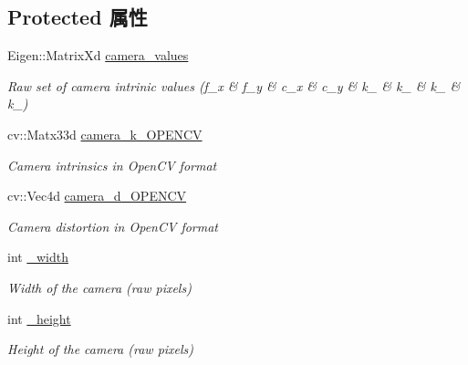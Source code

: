 \subsection*{Protected 属性}
\begin{DoxyCompactItemize}
\item 
\mbox{\label{classov__core_1_1CamBase_a3b9b353487071aef189fc5bc313dab5d}} 
Eigen\+::\+Matrix\+Xd \hyperlink{classov__core_1_1CamBase_a3b9b353487071aef189fc5bc313dab5d}{camera\+\_\+values}
\begin{DoxyCompactList}\small\item\em Raw set of camera intrinic values (f\+\_\+x \& f\+\_\+y \& c\+\_\+x \& c\+\_\+y \& k\+\_ \& k\+\_ \& k\+\_ \& k\+\_) \end{DoxyCompactList}\item 
\mbox{\label{classov__core_1_1CamBase_a867f7b5a903cc2776227c9b16fdde162}} 
cv\+::\+Matx33d \hyperlink{classov__core_1_1CamBase_a867f7b5a903cc2776227c9b16fdde162}{camera\+\_\+k\+\_\+\+O\+P\+E\+N\+CV}
\begin{DoxyCompactList}\small\item\em Camera intrinsics in Open\+CV format \end{DoxyCompactList}\item 
\mbox{\label{classov__core_1_1CamBase_a5783a122e28281c1cd72a23f4bee212c}} 
cv\+::\+Vec4d \hyperlink{classov__core_1_1CamBase_a5783a122e28281c1cd72a23f4bee212c}{camera\+\_\+d\+\_\+\+O\+P\+E\+N\+CV}
\begin{DoxyCompactList}\small\item\em Camera distortion in Open\+CV format \end{DoxyCompactList}\item 
\mbox{\label{classov__core_1_1CamBase_aa7b9e38e6da0ee85af5f82c3bc3ea91d}} 
int \hyperlink{classov__core_1_1CamBase_aa7b9e38e6da0ee85af5f82c3bc3ea91d}{\+\_\+width}
\begin{DoxyCompactList}\small\item\em Width of the camera (raw pixels) \end{DoxyCompactList}\item 
\mbox{\label{classov__core_1_1CamBase_aa9d833d887ee0ca92044e72d788c54de}} 
int \hyperlink{classov__core_1_1CamBase_aa9d833d887ee0ca92044e72d788c54de}{\+\_\+height}
\begin{DoxyCompactList}\small\item\em Height of the camera (raw pixels) \end{DoxyCompactList}\end{DoxyCompactItemize}


